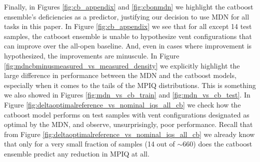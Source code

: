 Finally, in Figures \ref{fig:cb_appendix} and \ref{fig:cbonmdn} we highlight the {\sc catboost} ensemble's deficiencies as a predictor, justifying our decision to use MDN for all  tasks in this paper. In Figure \ref{fig:cb_appendix} we see that for all except 14 test samples, the {\sc catboost} ensemble is unable to hypothesize vent configurations that can improve over the all-open baseline.  And, even in cases where improvement is hypothesized, the improvements are minuscule. In Figure \ref{fig:mdncbminusmeasured_vs_measured_density} we explicitly highlight the large difference in performance between the MDN and the {\sc catboost} models, especially when it comes to the tails of the MPIQ distributions.  This is something  we also showed in Figures  \ref{fig:mdn_vs_cb_train} and \ref{fig:mdn_vs_cb_test}. In Figure \ref{fig:deltaoptimalreference_vs_nominal_iqs_all_cb} we check how the {\sc catboost} model performs on test samples with vent configurations designated as optimal by the MDN, and observe, unsurprisingly, poor performance. Recall that from Figure \ref{fig:deltaoptimalreference_vs_nominal_iqs_all_cb} we already know that only for a very small fraction of samples (14 out of $\sim660$) does the {\sc catboost} ensemble predict any reduction in MPIQ at all.

